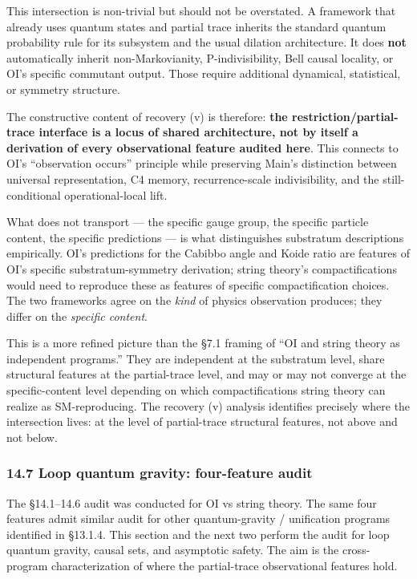 \documentclass[
]{article}
\begin{document}
This intersection is non-trivial but should not be overstated. A
framework that already uses quantum states and partial trace inherits
the standard quantum probability rule for its subsystem and the usual
dilation architecture. It does \textbf{not} automatically inherit
non-Markovianity, P-indivisibility, Bell causal locality, or OI's
specific commutant output. Those require additional dynamical,
statistical, or symmetry structure.

The constructive content of recovery (v) is therefore: \textbf{the
restriction/partial-trace interface is a locus of shared architecture,
not by itself a derivation of every observational feature audited here}.
This connects to OI's ``observation occurs'' principle while preserving
Main's distinction between universal representation, C4 memory,
recurrence-scale indivisibility, and the still-conditional
operational-local lift.

What does not transport --- the specific gauge group, the specific
particle content, the specific predictions --- is what distinguishes
substratum descriptions empirically. OI's predictions for the Cabibbo
angle and Koide ratio are features of OI's specific substratum-symmetry
derivation; string theory's compactifications would need to reproduce
these as features of specific compactification choices. The two
frameworks agree on the \emph{kind} of physics observation produces;
they differ on the \emph{specific content}.

This is a more refined picture than the §7.1 framing of ``OI and string
theory as independent programs.'' They are independent at the substratum
level, share structural features at the partial-trace level, and may or
may not converge at the specific-content level depending on which
compactifications string theory can realize as SM-reproducing. The
recovery (v) analysis identifies precisely where the intersection lives:
at the level of partial-trace structural features, not above and not
below.

\hypertarget{loop-quantum-gravity-four-feature-audit}{%
\subsubsection{14.7 Loop quantum gravity: four-feature
audit}\label{loop-quantum-gravity-four-feature-audit}}

The §14.1--14.6 audit was conducted for OI vs string theory. The same
four features admit similar audit for other quantum-gravity /
unification programs identified in §13.1.4. This section and the next
two perform the audit for loop quantum gravity, causal sets, and
asymptotic safety. The aim is the cross-program characterization of
where the partial-trace observational features hold.
\end{document}
